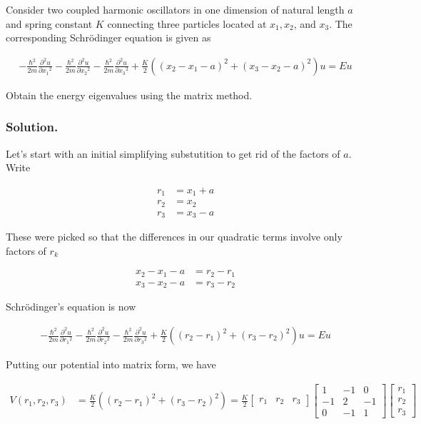 Consider two coupled harmonic oscillators in one dimension of natural length $a$ and spring constant $K$ connecting three particles located at $x_1, x_2$, and $x_3$.  The corresponding Schr\"{o}dinger equation is given as

\begin{align}\label{eqn:desaiCh9:700}
-\frac{\hbar^2}{2m} \frac{\partial^2 u}{\partial {x_1}^2}
-\frac{\hbar^2}{2m} \frac{\partial^2 u}{\partial {x_2}^2}
-\frac{\hbar^2}{2m} \frac{\partial^2 u}{\partial {x_3}^2}
+ \frac{K}{2}
\left(
(x_2 - x_1 - a)^2
+(x_3 - x_2 - a)^2
\right) u
= E u
\end{align}

Obtain the energy eigenvalues using the matrix method.

\subsubsection{Solution.}

Let's start with an initial simplifying substutition to get rid of the factors of $a$.  Write

\begin{align}\label{eqn:desaiCh9:701}
r_1 &= x_1 + a \\
r_2 &= x_2 \\
r_3 &= x_3 - a
\end{align}

These were picked so that the differences in our quadratic terms involve only factors of $r_k$

\begin{align}\label{eqn:desaiCh9:702}
x_2 - x_1 - a &= r_2 - r_1 \\
x_3 - x_2 - a &= r_3 - r_2
\end{align}

Schr\"{o}dinger's equation is now

\begin{align}\label{eqn:desaiCh9:700a}
-\frac{\hbar^2}{2m} \frac{\partial^2 u}{\partial {r_1}^2}
-\frac{\hbar^2}{2m} \frac{\partial^2 u}{\partial {r_2}^2}
-\frac{\hbar^2}{2m} \frac{\partial^2 u}{\partial {r_3}^2}
+ \frac{K}{2}
\left(
(r_2 - r_1)^2
+(r_3 - r_2)^2
\right) u
= E u
\end{align}

Putting our potential into matrix form, we have

\begin{align}\label{eqn:desaiCh9:703}
V(r_1, r_2, r_3) &=
\frac{K}{2}
\left(
(r_2 - r_1)^2
+(r_3 - r_2)^2
\right)
=
\frac{K}{2}
\begin{bmatrix}
r_1 & r_2 & r_3
\end{bmatrix}
\begin{bmatrix}
1 & -1 & 0 \\
-1 & 2 & -1 \\
0 & -1 & 1
\end{bmatrix}
\begin{bmatrix}
r_1 \\ r_2 \\ r_3
\end{bmatrix}
\end{align}

